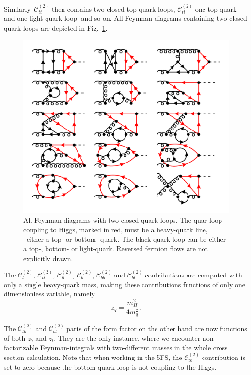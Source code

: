 Similarly, $\mathcal{C}_{tt}^{(2)}$ then contains two closed top-quark loops, $\mathcal{C}_{tl}^{(2)}$ one top-quark and one light-quark loop, and so on. All Feynman diagrams containing two closed quark-loops are depicted in Fig.~\ref{fig:5:C_tt}.
%
\begin{figure}[ht]
\centering
\includegraphics[width=\figurewidth]{Images/NNLO_Feynman_diagrams/C_tt.pdf}
\caption{All Feynman diagrams with two closed quark loops. The quar loop coupling to Higgs, marked in red, must be a heavy-quark line, \ie\ either a top- or bottom- quark. The black quark loop can be either a top-, bottom- or light-quark. Reversed fermion flows are not explicitly drawn.}
\label{fig:5:C_tt}
\end{figure}
The $\mathcal{C}_t^{(2)}$, $\mathcal{C}_{tt}^{(2)}$, $\mathcal{C}_{tl}^{(2)}$, $\mathcal{C}_b^{(2)}$, $\mathcal{C}_{bb}^{(2)}$ and $\mathcal{C}_{bl}^{(2)}$ contributions are computed with only a single heavy-quark mass, making these contributions functions of only one dimensionless variable, namely
\begin{equation}
z_q = \frac{m_H^2}{4 m_q^2}.
\end{equation}

The $\mathcal{C}_{tb}^{(2)}$ and $\mathcal{C}_{bt}^{(2)}$ parts of the form factor on the other hand are now functions of both $z_b$ and $z_t$. They are the only instance, where we encounter non-factorizable Feynman-integrals with two-different masses in the whole cross section calculation. Note that when working in the 5\acs{FS}, the $\mathcal{C}_{tb}^{(2)}$ contribution is set to zero because the bottom quark loop is not coupling to the Higgs.

